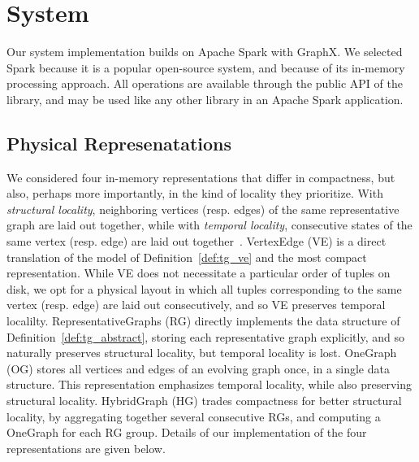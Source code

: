 \section{System}
\label{sec:sys}

Our \ql system implementation builds on Apache Spark with GraphX.  We
selected Spark because it is a popular open-source system, and because
of its in-memory processing approach.  All \tg operations are
available through the public API of the \ql library, and may be used
like any other library in an Apache Spark application.


\subsection{Physical Represenatations}
\label{sec:sys:datastructs}

We considered four in-memory \tg representations that differ in
compactness, but also, perhaps more importantly, in the kind of
locality they prioritize. With {\em structural locality}, neighboring
vertices (resp. edges) of the same representative graph are laid out
together, while with {\em temporal locality}, consecutive states of
the same vertex (resp. edge) are laid out
together~\cite{DBLP:journals/tos/MiaoHLWYZPCC15}.  VertexEdge
(VE) is a direct translation of the \ve model of Definition~\ref{def:tg_ve} and
the most compact representation.  While VE
does not necessitate a particular order of tuples on disk, we opt
for a physical layout in which all tuples corresponding to the same
vertex (resp. edge) are laid out consecutively, and so VE preserves
temporal localilty.  RepresentativeGraphs (RG)  directly implements the data structure of
Definition~\ref{def:tg_abstract}, storing each representative graph
explicitly, and so naturally preserves structural locality, but
temporal locality is lost.
OneGraph (OG)
stores all vertices and edges of an evolving graph once, in a single
data structure.  This representation emphasizes temporal locality,
while also preserving structural locality.  HybridGraph (HG) trades
compactness for better structural locality, by aggregating together
several consecutive RGs, and computing a OneGraph for each RG group.
Details of our implementation of the four representations
are given below.

